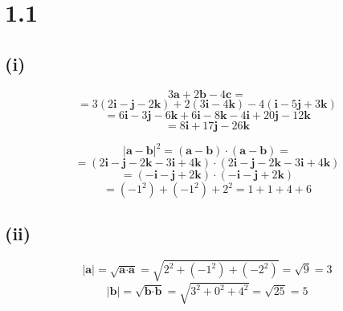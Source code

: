 \documentclass{article}
\begin{document}
\section*{1.1}

\subsection*{(i)}
\begin{equation*}
    3 \textbf{a} + 2 \textbf{b} - 4 \textbf{c} = 
\end{equation*}
\begin{equation*}
    = 3(2 \textbf{i} - \textbf{j} - 2 \textbf{k}) + 2(3 \textbf{i} - 4 \textbf{k}) - 4(\textbf{i} - 5 \textbf{j} + 3 \textbf{k})
\end{equation*}
\begin{equation*}
    = 6\textbf{i} - 3\textbf{j} - 6\textbf{k} + 6\textbf{i} - 8\textbf{k} - 4\textbf{i} + 20\textbf{j} - 12\textbf{k}
\end{equation*}
\begin{equation*}
    = 8\textbf{i} + 17\textbf{j} -26\textbf{k}
\end{equation*}

\begin{equation*}
    |\textbf{a} - \textbf{b}|^2 = (\textbf{a} - \textbf{b}) \cdot (\textbf{a} - \textbf{b}) = 
\end{equation*}
\begin{equation*}
    = (2\textbf{i} - \textbf{j} -2\textbf{k} - 3\textbf{i} + 4\textbf{k}) \cdot (2\textbf{i} - \textbf{j} -2\textbf{k} - 3\textbf{i} + 4\textbf{k})
\end{equation*}
\begin{equation*}
    = (- \textbf{i} - \textbf{j} +2 \textbf{k} ) \cdot (- \textbf{i} - \textbf{j} +2 \textbf{k} )
\end{equation*}
\begin{equation*}
    = (-1^2) + (-1^2) + 2^2 = 1 + 1 + 4 + 6
\end{equation*}

\subsection*{(ii)}

\begin{equation*}
    |\textbf{a}| = \sqrt{\textbf{a} \cdot \textbf{a}} = \sqrt{2^2 + (-1^2) + (-2^2)} = \sqrt{9} = 3
\end{equation*}
\begin{equation*}
    |\textbf{b}| = \sqrt{\textbf{b} \cdot \textbf{b}} = \sqrt{3^2 + 0^2 + 4^2} = \sqrt{25} = 5
\end{equation*}
\end{document}
